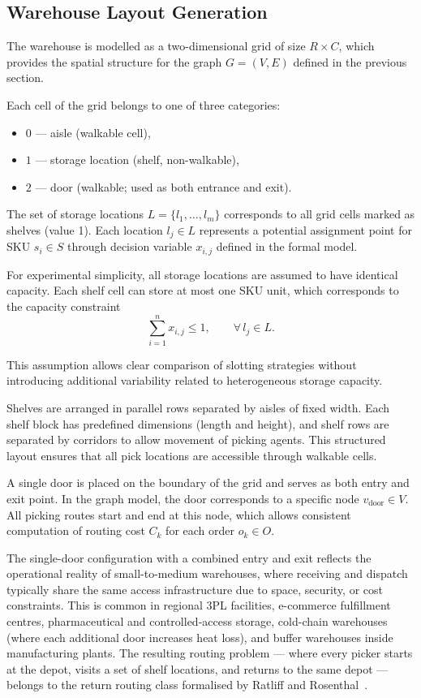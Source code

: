 \documentclass[12pt,a4paper]{article}
\begin{document}
\subsection{Warehouse Layout Generation}

The warehouse is modelled as a two-dimensional grid of size $R \times C$, which provides the
spatial structure for the graph $G = (V, E)$ defined in the previous section.

Each cell of the grid belongs to one of three categories:
\begin{itemize}
  \item $0$ --- aisle (walkable cell),
  \item $1$ --- storage location (shelf, non-walkable),
  \item $2$ --- door (walkable; used as both entrance and exit).
\end{itemize}

The set of storage locations $L = \{l_1, \ldots, l_m\}$ corresponds to all grid cells marked
as shelves (value 1). Each location $l_j \in L$ represents a potential assignment point for
SKU $s_i \in S$ through decision variable $x_{i,j}$ defined in the formal model.

For experimental simplicity, all storage locations are assumed to have identical capacity.
Each shelf cell can store at most one SKU unit, which corresponds to the capacity constraint
\[
  \sum_{i=1}^{n} x_{i,j} \leq 1, \qquad \forall\, l_j \in L.
\]

This assumption allows clear comparison of slotting strategies without introducing additional
variability related to heterogeneous storage capacity.

Shelves are arranged in parallel rows separated by aisles of fixed width. Each shelf block
has predefined dimensions (length and height), and shelf rows are separated by corridors to
allow movement of picking agents. This structured layout ensures that all pick locations are
accessible through walkable cells.

A single door is placed on the boundary of the grid and serves as both entry and exit point.
In the graph model, the door corresponds to a specific node $v_\mathrm{door} \in V$. All
picking routes start and end at this node, which allows consistent computation of routing
cost $C_k$ for each order $o_k \in O$.

The single-door configuration with a combined entry and exit reflects the operational
reality of small-to-medium warehouses, where receiving and dispatch typically share the
same access infrastructure due to space, security, or cost constraints. This is common
in regional 3PL facilities, e-commerce fulfillment centres, pharmaceutical and
controlled-access storage, cold-chain warehouses (where each additional door increases
heat loss), and buffer warehouses inside manufacturing plants. The resulting routing
problem --- where every picker starts at the depot, visits a set of shelf locations,
and returns to the same depot --- belongs to the return routing class formalised by
Ratliff and Rosenthal~\cite{ref_ratliff}.
\end{document}
